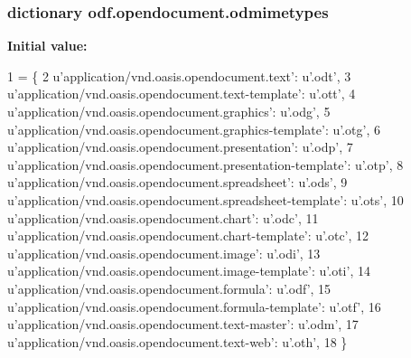 \hypertarget{namespaceodf_1_1opendocument_a5b88ff682371ff9d1cd3d545484e3bfb}{
\subsubsection[{odmimetypes}]{\setlength{\rightskip}{0pt plus 5cm}dictionary odf.\+opendocument.\+odmimetypes}}\label{namespaceodf_1_1opendocument_a5b88ff682371ff9d1cd3d545484e3bfb}
{\bfseries Initial value\+:}
\begin{DoxyCode}
1 = \{
2  \textcolor{stringliteral}{u'application/vnd.oasis.opendocument.text'}:                  \textcolor{stringliteral}{u'.odt'},
3  \textcolor{stringliteral}{u'application/vnd.oasis.opendocument.text-template'}:         \textcolor{stringliteral}{u'.ott'},
4  \textcolor{stringliteral}{u'application/vnd.oasis.opendocument.graphics'}:              \textcolor{stringliteral}{u'.odg'},
5  \textcolor{stringliteral}{u'application/vnd.oasis.opendocument.graphics-template'}:     \textcolor{stringliteral}{u'.otg'},
6  \textcolor{stringliteral}{u'application/vnd.oasis.opendocument.presentation'}:          \textcolor{stringliteral}{u'.odp'},
7  \textcolor{stringliteral}{u'application/vnd.oasis.opendocument.presentation-template'}: \textcolor{stringliteral}{u'.otp'},
8  \textcolor{stringliteral}{u'application/vnd.oasis.opendocument.spreadsheet'}:           \textcolor{stringliteral}{u'.ods'},
9  \textcolor{stringliteral}{u'application/vnd.oasis.opendocument.spreadsheet-template'}:  \textcolor{stringliteral}{u'.ots'},
10  \textcolor{stringliteral}{u'application/vnd.oasis.opendocument.chart'}:                 \textcolor{stringliteral}{u'.odc'},
11  \textcolor{stringliteral}{u'application/vnd.oasis.opendocument.chart-template'}:        \textcolor{stringliteral}{u'.otc'},
12  \textcolor{stringliteral}{u'application/vnd.oasis.opendocument.image'}:                 \textcolor{stringliteral}{u'.odi'},
13  \textcolor{stringliteral}{u'application/vnd.oasis.opendocument.image-template'}:        \textcolor{stringliteral}{u'.oti'},
14  \textcolor{stringliteral}{u'application/vnd.oasis.opendocument.formula'}:               \textcolor{stringliteral}{u'.odf'},
15  \textcolor{stringliteral}{u'application/vnd.oasis.opendocument.formula-template'}:      \textcolor{stringliteral}{u'.otf'},
16  \textcolor{stringliteral}{u'application/vnd.oasis.opendocument.text-master'}:           \textcolor{stringliteral}{u'.odm'},
17  \textcolor{stringliteral}{u'application/vnd.oasis.opendocument.text-web'}:              \textcolor{stringliteral}{u'.oth'},
18 \}
\end{DoxyCode}



